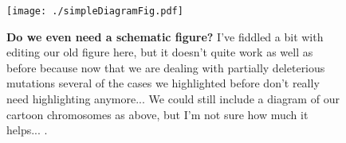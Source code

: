 \documentclass{article}[12pt]
\begin{document}
 \begin{figure}[htbp]
 \centering
 \texttt{[image: ./simpleDiagramFig.pdf]}
 \caption{\textbf{Do we even need a schematic figure?} I've fiddled a bit with editing our old figure here, but it doesn't quite work as well as before because now that we are dealing with partially deleterious mutations several of the cases we highlighted before don't really need highlighting anymore... We could still include a diagram of our cartoon chromosomes as above, but I'm not sure how much it helps... . }
 \label{fig:diagramFig}
 \end{figure}
\end{document}
